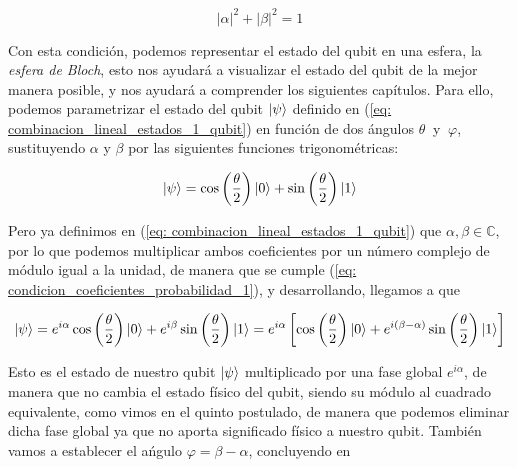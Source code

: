 \documentclass{article}
\numberwithin{equation}{section} %
\begin{document}
    \begin{equation}
        | \alpha | ^ {2} + | \beta | ^ {2} = 1
        \label{eq: condicion_coeficientes_probabilidad_1}
    \end{equation}

    \vspace{2.5mm}

    Con esta condición, podemos representar el estado del qubit en una esfera, la \textit{esfera de Bloch}, esto nos ayudará a visualizar el estado del qubit de la mejor manera posible, y nos ayudará a comprender los siguientes capítulos. Para ello, podemos parametrizar el estado del qubit \( \ket{\psi} \) definido en (\ref{eq: combinacion_lineal_estados_1_qubit}) en función de dos ángulos \( \theta \ \) y \( \ \varphi \), sustituyendo \( \alpha \) y \( \beta \) por las siguientes funciones trigonométricas:

    \begin{equation*}
        \ket{\psi} = \cos \left( \frac{\theta}{2} \right) \ket{0} + \sin \left( \frac{\theta}{2} \right) \ket{1}
    \end{equation*}

    \vspace{2.5mm}

    Pero ya definimos en (\ref{eq: combinacion_lineal_estados_1_qubit}) que \( \alpha, \beta \in \mathbb{C} \), por lo que podemos multiplicar ambos coeficientes por un número complejo de módulo igual a la unidad, de manera que se cumple (\ref{eq: condicion_coeficientes_probabilidad_1}), y desarrollando, llegamos a que 

    \begin{equation*}
        \ket{\psi} = e^{i \alpha} \cos \left( \frac{\theta}{2} \right) \ket{0} + e^{i \beta} \sin \left( \frac{\theta}{2} \right) \ket{1} = e^{i \alpha} \left[ \cos \left( \frac{\theta}{2} \right) \ket{0} + e^{i (\beta - \alpha)} \sin \left( \frac{\theta}{2} \right) \ket{1} \right]
    \end{equation*}

    \vspace{2.5mm}

    Esto es el estado de nuestro qubit \( \ket{\psi} \) multiplicado por una fase global \( e^{i \alpha} \), de manera que no cambia el estado físico del qubit, siendo su módulo al cuadrado equivalente, como vimos en el quinto postulado, de manera que podemos eliminar dicha fase global ya que no aporta significado físico a nuestro qubit. También vamos a establecer el ańgulo \( \varphi = \beta - \alpha \), concluyendo en 
    
\end{document}
